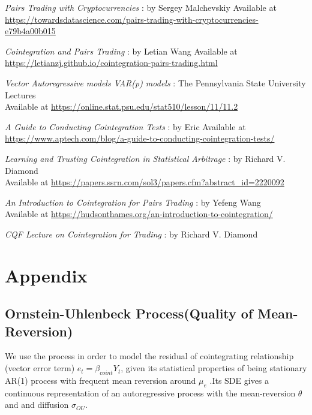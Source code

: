 \documentclass[a4paper, 11pt]{article}
\begin{document}
\begin{enumerate}[ {[}1{]} ]
\item \textit{Pairs Trading with Cryptocurrencies} : by Sergey Malchevskiy Available at\\
\url{https://towardsdatascience.com/pairs-trading-with-cryptocurrencies-e79b4a00b015}

\item \textit{Cointegration and Pairs Trading} : by Letian Wang Available at\\
\url{https://letianzj.github.io/cointegration-pairs-trading.html}

\item \textit{Vector Autoregressive models VAR(p) models} : The Pennsylvania State University Lectures\\
 Available at \url{https://online.stat.psu.edu/stat510/lesson/11/11.2}

\item \textit{A Guide to Conducting Cointegration Tests} : by Eric Available at\\
\url{https://www.aptech.com/blog/a-guide-to-conducting-cointegration-tests/}
 
\item \textit{Learning and Trusting Cointegration in Statistical Arbitrage} : by Richard V. Diamond \\
Available at \url{https://papers.ssrn.com/sol3/papers.cfm?abstract_id=2220092}

\item \textit{An Introduction to Cointegration for Pairs Trading} : by Yefeng Wang \\
Available at \url{https://hudsonthames.org/an-introduction-to-cointegration/}

\item \textit{CQF Lecture on Cointegration for Trading} : by Richard V. Diamond 

\end{enumerate}

\pagebreak

\section{Appendix}

\subsection{Ornstein-Uhlenbeck Process(Quality of Mean-Reversion)}

We use the process in order to model the residual of cointegrating relationship (vector error term) $e_t = \beta_{coint} Y_t$, given its statistical properties of being stationary AR(1) process with frequent mean reversion around $\mu_e$ .Its SDE gives a continuous representation of an autoregressive process with the mean-reversion $\theta$ and 
and diffusion $\sigma_{OU} $.
\end{document}
